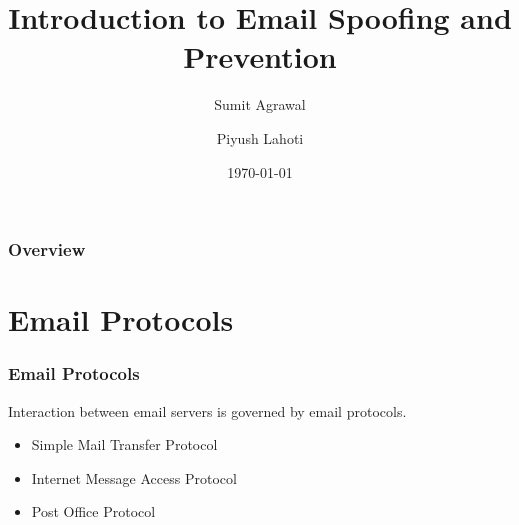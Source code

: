 \documentclass{beamer}
\title[Email Spoofing]{Introduction to Email Spoofing and Prevention} %
\author{Sumit Agrawal
        \and
        Piyush Lahoti
        } %
\institute[IITI] %
{
Indian Institute of Technology Indore \\ %
\medskip
\textit{sumit4iit@gmail.com\\ piyush@iiti.ac.in} %
}
\date{\today} %
\begin{document}
\begin{frame}
\titlepage %
\end{frame}

\begin{frame}
\frametitle{Overview} %
\tableofcontents %
\end{frame}


\section{Email Protocols} %


\begin{frame}
\frametitle{Email Protocols}

Interaction between email servers is governed by email protocols.
\begin{itemize}
  \item Simple Mail Transfer Protocol
  \item Internet Message Access Protocol
  \item Post Office Protocol
\end{itemize}

\end{frame}

\end{document}
